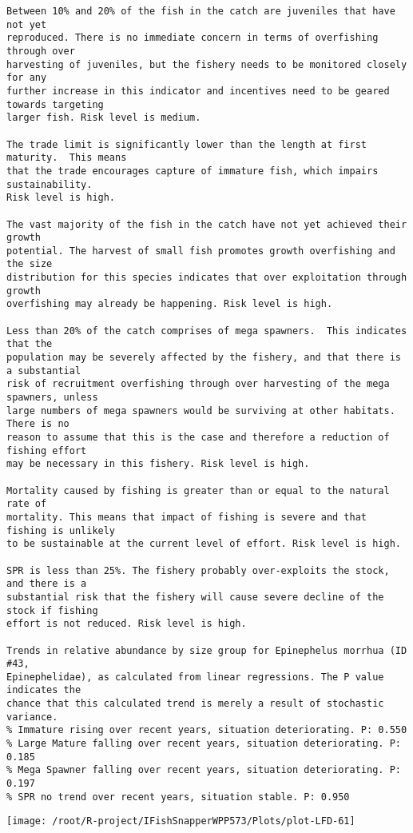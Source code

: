\documentclass{report}\usepackage[]{graphicx}\usepackage[]{color}
\makeatletter
\def\maxwidth{ %
  \ifdim\Gin@nat@width>\linewidth
    \linewidth
  \else
    \Gin@nat@width
  \fi
}
\newenvironment{kframe}{%
 \def\at@end@of@kframe{}%
 \ifinner\ifhmode%
  \def\at@end@of@kframe{\end{minipage}}%
  \begin{minipage}{\columnwidth}%
 \fi\fi%
 \def\FrameCommand##1{\hskip\@totalleftmargin \hskip-\fboxsep
 \colorbox{shadecolor}{##1}\hskip-\fboxsep
     \hskip-\linewidth \hskip-\@totalleftmargin \hskip\columnwidth}%
 \MakeFramed {\advance\hsize-\width
   \@totalleftmargin\z@ \linewidth\hsize
   \@setminipage}}%
 {\par\unskip\endMakeFramed%
 \at@end@of@kframe}
\newenvironment{knitrout}{}{} %
\makeatother
\begin{document}
\begin{knitrout}
\begin{kframe}
\begin{verbatim}
Between 10% and 20% of the fish in the catch are juveniles that have not yet
reproduced. There is no immediate concern in terms of overfishing through over
harvesting of juveniles, but the fishery needs to be monitored closely for any
further increase in this indicator and incentives need to be geared towards targeting
larger fish. Risk level is medium.

The trade limit is significantly lower than the length at first maturity.  This means
that the trade encourages capture of immature fish, which impairs sustainability.
Risk level is high.

The vast majority of the fish in the catch have not yet achieved their growth
potential. The harvest of small fish promotes growth overfishing and the size
distribution for this species indicates that over exploitation through growth
overfishing may already be happening. Risk level is high.

Less than 20% of the catch comprises of mega spawners.  This indicates that the
population may be severely affected by the fishery, and that there is a substantial
risk of recruitment overfishing through over harvesting of the mega spawners, unless
large numbers of mega spawners would be surviving at other habitats. There is no
reason to assume that this is the case and therefore a reduction of fishing effort
may be necessary in this fishery. Risk level is high.
 
Mortality caused by fishing is greater than or equal to the natural rate of
mortality. This means that impact of fishing is severe and that fishing is unlikely
to be sustainable at the current level of effort. Risk level is high.
 
SPR is less than 25%. The fishery probably over-exploits the stock, and there is a
substantial risk that the fishery will cause severe decline of the stock if fishing
effort is not reduced. Risk level is high.
 
Trends in relative abundance by size group for Epinephelus morrhua (ID #43,
Epinephelidae), as calculated from linear regressions. The P value indicates the
chance that this calculated trend is merely a result of stochastic variance.
% Immature rising over recent years, situation deteriorating. P: 0.550
% Large Mature falling over recent years, situation deteriorating. P: 0.185
% Mega Spawner falling over recent years, situation deteriorating. P: 0.197
% SPR no trend over recent years, situation stable. P: 0.950
\end{verbatim}
\end{kframe}
\texttt{[image: /root/R-project/IFishSnapperWPP573/Plots/plot-LFD-61]} 


\end{knitrout}
\end{document}
